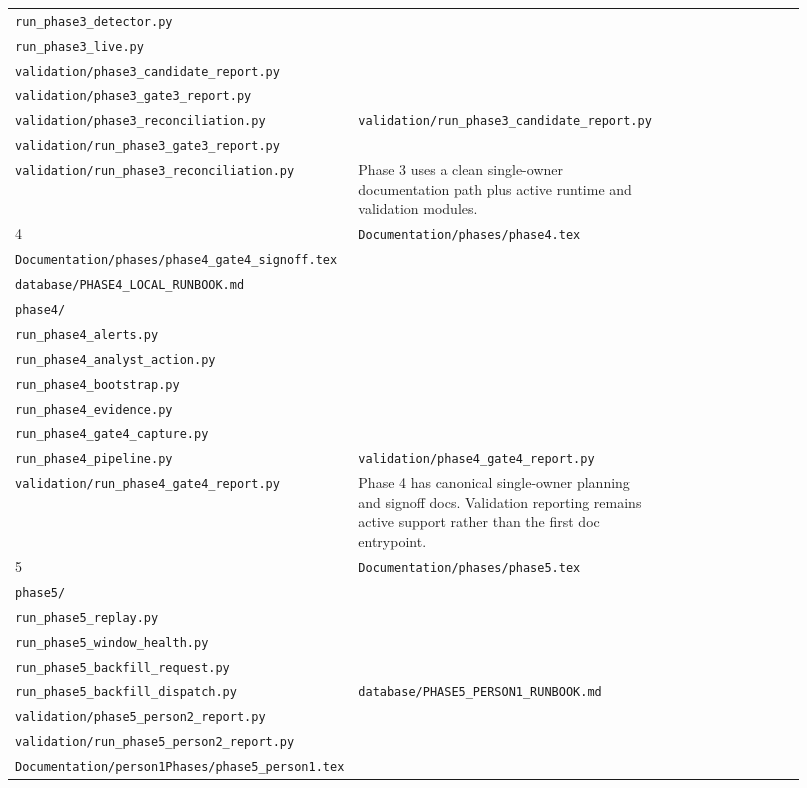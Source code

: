 \documentclass{article}
\begin{document}
\begin{longtable}{p{0.08\linewidth}p{0.31\linewidth}p{0.27\linewidth}p{0.26\linewidth}}
\texttt{run\_phase3\_detector.py}\\
\texttt{run\_phase3\_live.py}\\
\texttt{validation/phase3\_candidate\_report.py}\\
\texttt{validation/phase3\_gate3\_report.py}\\
\texttt{validation/phase3\_reconciliation.py}
&
\texttt{validation/run\_phase3\_candidate\_report.py}\\
\texttt{validation/run\_phase3\_gate3\_report.py}\\
\texttt{validation/run\_phase3\_reconciliation.py}
&
Phase 3 uses a clean single-owner documentation path plus active runtime and validation modules. \\
4 &
\texttt{Documentation/phases/phase4.tex}\\
\texttt{Documentation/phases/phase4\_gate4\_signoff.tex}\\
\texttt{database/PHASE4\_LOCAL\_RUNBOOK.md}\\
\texttt{phase4/}\\
\texttt{run\_phase4\_alerts.py}\\
\texttt{run\_phase4\_analyst\_action.py}\\
\texttt{run\_phase4\_bootstrap.py}\\
\texttt{run\_phase4\_evidence.py}\\
\texttt{run\_phase4\_gate4\_capture.py}\\
\texttt{run\_phase4\_pipeline.py}
&
\texttt{validation/phase4\_gate4\_report.py}\\
\texttt{validation/run\_phase4\_gate4\_report.py}
&
Phase 4 has canonical single-owner planning and signoff docs. Validation reporting remains active support rather than the first doc entrypoint. \\
5 &
\texttt{Documentation/phases/phase5.tex}\\
\texttt{phase5/}\\
\texttt{run\_phase5\_replay.py}\\
\texttt{run\_phase5\_window\_health.py}\\
\texttt{run\_phase5\_backfill\_request.py}\\
\texttt{run\_phase5\_backfill\_dispatch.py}
&
\texttt{database/PHASE5\_PERSON1\_RUNBOOK.md}\\
\texttt{validation/phase5\_person2\_report.py}\\
\texttt{validation/run\_phase5\_person2\_report.py}\\
\texttt{Documentation/person1Phases/phase5\_person1.tex}\\

\end{longtable}
\end{document}
